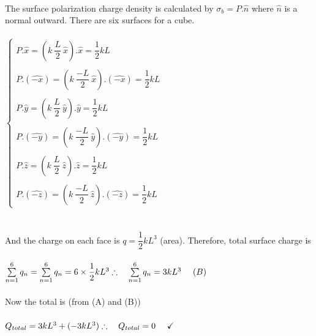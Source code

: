 \documentclass[fleqn]{article}
\begin{document}
\begin{enumerate}
{        \\
        The surface polarization charge density is calculated by $\sigma_b=P.\hat{n}$ where $\hat{n}$ is a normal outward. There are six 
        surfaces for a cube.
        \\
        \\
        $
          \begin{cases}
            P.\hat{x}=\left(k ~ \dfrac{L}{2} ~ \hat{x}\right).\hat{x}=\dfrac{1}{2}kL
            \\
            \\
            P.\left(\hat{-x}\right)=\left(k ~ \dfrac{-L}{2} ~ \hat{x}\right).\left(\hat{-x}\right)=\dfrac{1}{2}kL
            \\
            \\
            P.\hat{y}=\left(k ~ \dfrac{L}{2} ~ \hat{y}\right).\hat{y}=\dfrac{1}{2}kL
            \\
            \\
            P.\left(\hat{-y}\right)=\left(k ~ \dfrac{-L}{2} ~ \hat{y}\right).\left(\hat{-y}\right)=\dfrac{1}{2}kL
            \\
            \\
            P.\hat{z}=\left(k ~ \dfrac{L}{2} ~ \hat{z}\right).\hat{z}=\dfrac{1}{2}kL
            \\
            \\
            P.\left(\hat{-z}\right)=\left(k ~ \dfrac{-L}{2} ~ \hat{z}\right).\left(\hat{-z}\right)=\dfrac{1}{2}kL
          \end{cases}
        $
        \\
        \\
        \\
        And the charge on each face is $q=\dfrac{1}{2}kL^3$ (area). Therefore, total surface charge is
        \\
        \\
        $
          \sum\limits_{n=1}^{6} q_n=\sum\limits_{n=1}^{6} q_n=6 \times \dfrac{1}{2}kL^3
          \\
          \\
          \\
          \therefore ~~~ \sum\limits_{n=1}^{6} q_n=3kL^3 ~~~~ (B)
        $
        \\
        \\
        Now the total is (from (A) and (B))
        \\
        \\
        $
          Q_{total}=3kL^3+(-3kL^3)
          \\
          \\
          \\
          \therefore ~~~ Q_{total}=0 ~~~~ \checkmark
        $
        \\
      }


\end{enumerate}
\end{document}
